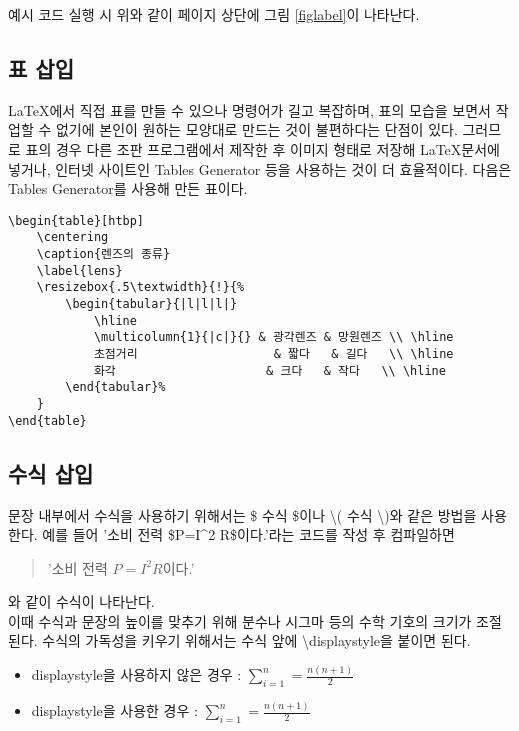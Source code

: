 \noindent 예시 코드 실행 시 위와 같이 페이지 상단에 그림 \ref{figlabel}이 나타난다.

\subsection{표 삽입}

\LaTeX 에서 직접 표를 만들 수 있으나 명령어가 길고 복잡하며, 표의 모습을 보면서 작업할 수 없기에 본인이 원하는 모양대로 만드는 것이 불편하다는 단점이 있다.
그러므로 표의 경우 다른 조판 프로그램에서 제작한 후 이미지 형태로 저장해 \LaTeX 문서에 넣거나, 인터넷 사이트인 Tables Generator 등을 사용하는 것이 더 효율적이다. 다음은 Tables Generator를 사용해 만든 표이다.
\begin{lstlisting}
\begin{table}[htbp]
	\centering
	\caption{렌즈의 종류}
	\label{lens}
	\resizebox{.5\textwidth}{!}{%
		\begin{tabular}{|l|l|l|}
			\hline
			\multicolumn{1}{|c|}{} & 광각렌즈 & 망원렌즈 \\ \hline
			초점거리                   & 짧다   & 길다   \\ \hline
			화각                     & 크다   & 작다   \\ \hline
		\end{tabular}%
	}
\end{table}
\end{lstlisting}

\begin{table}[htbp]
	\centering
	\caption{렌즈의 종류}
	\label{lens}
\end{table}

\subsection{수식 삽입}

문장 내부에서 수식을 사용하기 위해서는 \$ 수식 \$이나 \textbackslash( 수식 \textbackslash)와 같은 방법을 사용한다.
예를 들어 '소비 전력 \$P=I\^{}2 R\$이다.'라는 코드를 작성 후 컴파일하면
\begin{quote}
'소비 전력 $P=I^2 R$이다.'
\end{quote}
\noindent 와 같이 수식이 나타난다. \\
이때 수식과 문장의 높이를 맞추기 위해 분수나 시그마 등의 수학 기호의 크기가 조절된다. 수식의 가독성을 키우기 위해서는 수식 앞에 \textbackslash displaystyle을 붙이면 된다.
\begin{itemize}
	\item displaystyle을 사용하지 않은 경우 : $\sum_{i=1}^{n} = \frac{n(n+1)}{2}$
	\item displaystyle을 사용한 경우 : \(\displaystyle \sum_{i=1}^{n} = \frac{n(n+1)}{2}\)
\end{itemize}

